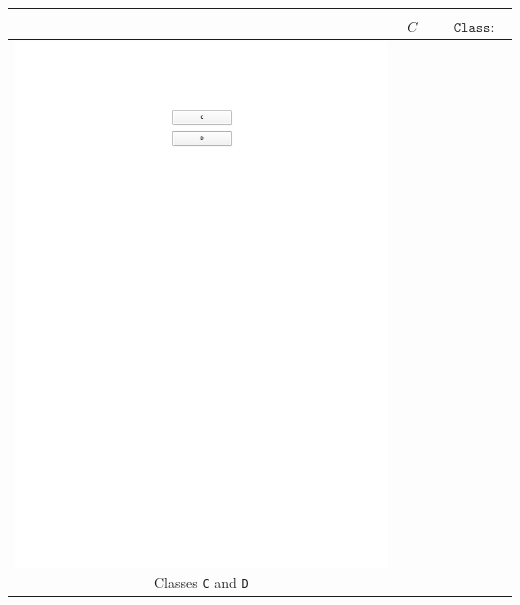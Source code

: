 \documentclass[11pt,final,onecolumn]{report}
\newcommand\umltablespacing{3cm}
\newcommand\dltablespacing{4.5cm}
\begin{document}
\begin{longtable}{|>{\scriptsize}c|>{\scriptsize}l|>{\scriptsize}l|}
\begin{minipage}{\umltablespacing}
    \end{minipage}
    &
    \begin{minipage}{\dltablespacing}
       $\begin{aligned}  
       \\
	  C
         \end{aligned}$       
    \end{minipage}
    &
      $\begin{aligned}
	  &\texttt{}\\
	  &\texttt{Class: C}
     \end{aligned}$
    \\\hline
    \begin{minipage}{\umltablespacing}  
      \centering\includegraphics[trim = 85mm 238mm 70mm 28mm, clip, scale=0.75]{./diagrams/chapter5/DisjointClasses}
     Classes \texttt{C} and \texttt{D}
     \vspace{2mm}

\end{minipage}
\end{longtable}
\end{document}
